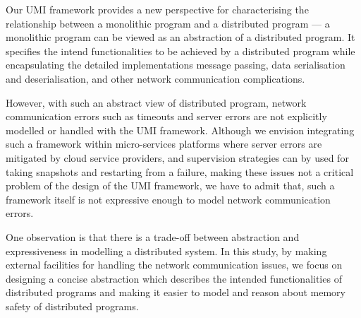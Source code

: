 Our UMI framework provides a new perspective for characterising the relationship between a monolithic program and a distributed program --- a monolithic program can be viewed as an abstraction of a distributed program. It specifies the intend functionalities to be achieved by a distributed program while encapsulating the detailed implementations message passing, data serialisation and deserialisation, and other network communication complications.

However, with such an abstract view of distributed program, network communication errors such as timeouts and server errors are not explicitly modelled or handled with the UMI framework. Although we envision integrating such a framework within micro-services platforms where server errors are mitigated by cloud service providers, and supervision strategies can by used for taking snapshots and restarting from a failure, making these issues not a critical problem of the design of the UMI framework, we have to admit that, such a framework itself is not expressive enough to model network communication errors.

One observation is that there is a trade-off between abstraction and expressiveness in modelling a distributed system. In this study, by making external facilities for handling the network communication issues, we focus on designing a concise abstraction which describes the intended functionalities of distributed programs and making it easier to model and reason about memory safety of distributed programs.